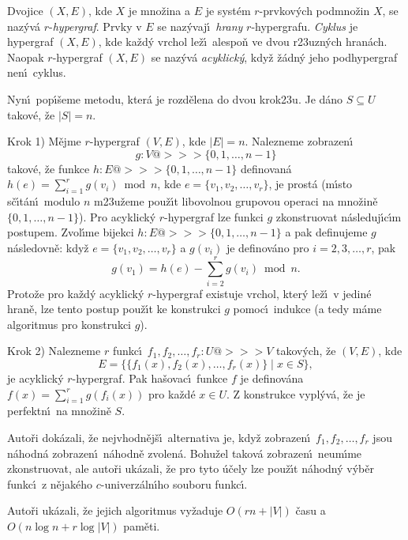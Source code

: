 \documentclass[a4paper,12pt]{article}
\begin{document}
\flushpar Dvojice $(X,E)$, kde $X$ je mno\v zina a $E$ je syst\'em 
$r$-prvkov\'ych podmno\v zin $X$, se naz\'yv\'a $r$-\emph{hypergraf}.  
Prvky v $E$ se naz\'yvaj\'\i\ \emph{hrany} $r$-hypergrafu.  
\emph{Cyklus} je hypergraf $(X,E)$, kde ka\v zd\'y vrchol le\v z\'\i\ 
alespo\v n ve dvou r\accent23uzn\'ych hran\'ach.  Naopak 
$r$-hypergraf $(X,E)$ se naz\'yv\'a \emph{acyklick\'y}, kdy\v z 
\v z\'adn\'y jeho podhypergraf nen\'\i\ cyklus.  
\medskip

\flushpar Nyn\'\i\ pop\'\i\v seme metodu, kter\'a je rozd\v elena do 
dvou krok\accent23u. Je d\'ano $S\subseteq U$ takov\'e, \v ze 
$|S|=n$.
\medskip

\flushpar Krok 1) M\v ejme $r$-hypergraf $(V,E)$, kde $|E|=n$.  Nalezneme 
zobrazen\'\i\ 
$$g:V@>>>\{0,1,\dots,n-1\}$$
takov\'e, \v ze funkce 
$h:E@>>>\{0,1,\dots,n-1\}$ definovan\'a $h(e)=\sum_{i=1}^rg(v_i)\bmod 
n$, 
kde $e=\{v_1,v_2,\dots,v_r\}$, je prost\'a (m\'\i sto s\v c\'\i t\'an\'\i\ modulo $
n$ 
m\accent23u\v zeme pou\v z\'\i t libovolnou grupovou operaci na 
mno\v zin\v e $\{0,1,\dots,n-1\}$).  Pro acyklick\'y $r$-hypergraf lze 
funkci $g$ zkonstruovat n\'asle\-duj\'\i c\'\i m postupem.  Zvol\'\i me 
bijekci $h:E@>>>\{0,1,\dots,n-1\}$ a pak definujeme $g$ 
n\'asledovn\v e:  kdy\v z $e=\{v_1,v_2,\dots,v_r\}$ a $g(v_i)$ je 
definov\'ano pro $i=2,3,\dots,r$, pak 
$$g(v_1)=h(e)-\sum_{i=2}^rg(v_i)\bmod n.$$
Proto\v ze pro ka\v zd\'y acyklick\'y $r$-hypergraf existuje vrchol, kter\'y 
le\v z\'\i\ v jedin\'e hran\v e, lze tento postup pou\v z\'\i t ke konstrukci $
g$ 
pomoc\'\i\ indukce (a tedy m\'ame algoritmus pro konstrukci $g$).  
\smallskip

\flushpar Krok 2) Nalezneme $r$ funkc\'\i\ $f_1,f_2,\dots,f_r:U@>>>
V$ takov\'ych, \v ze 
$(V,E)$, kde 
$$E=\{\{f_1(x),f_2(x),\dots,f_r(x)\}\mid x\in S\},$$
 je acyklick\'y 
$r$-hypergraf.  Pak ha\v sovac\'\i\ funkce $f$ je definov\'ana 
$f(x)=\sum_{i=1}^rg(f_i(x))$ pro ka\v zd\'e $x\in U$.  Z konstrukce 
vypl\'yv\'a, \v ze je perfektn\'\i\ na mno\v zin\v e $S$.  
\medskip

\flushpar Auto\v ri dok\'azali, \v ze 
nejvhodn\v ej\v s\'\i\ alternativa je, kdy\v z zobrazen\'\i\ $f_1
,f_2,\dots,f_r$ 
jsou n\'ahodn\'a zob\-razen\'\i\ n\'ahodn\v e zvolen\'a. Bohu\-\v zel takov\'a 
zobrazen\'\i\ neum\'\i me zkonstruovat, ale auto\v ri uk\'azali, \v ze 
pro tyto \'u\v cely lze pou\v z\'\i t n\'ahodn\'y v\'yb\v er funkc\'\i\ z 
n\v ejak\'eho $c$-univerz\'aln\'\i ho souboru funk\-c\'\i . 
\medskip

\flushpar Auto\v ri uk\'azali, \v ze jejich algoritmus vy\v zaduje $
O(rn+|V|)$ 
\v casu a $O(n\log n+r\log|V|)$ pam\v eti. 
\medskip
\end{document}
